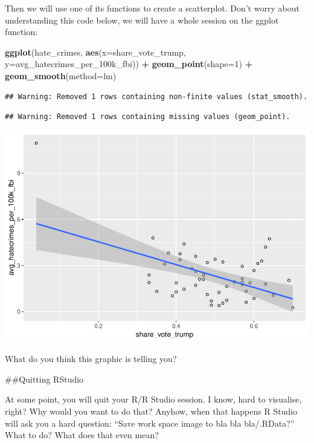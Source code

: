 \documentclass[]{book}
\newenvironment{Shaded}{\begin{snugshade}}{\end{snugshade}}
\newcommand{\DataTypeTok}[1]{\textcolor[rgb]{0.13,0.29,0.53}{#1}}
\newcommand{\DecValTok}[1]{\textcolor[rgb]{0.00,0.00,0.81}{#1}}
\newcommand{\KeywordTok}[1]{\textcolor[rgb]{0.13,0.29,0.53}{\textbf{#1}}}
\newcommand{\NormalTok}[1]{#1}
\newcommand{\OperatorTok}[1]{\textcolor[rgb]{0.81,0.36,0.00}{\textbf{#1}}}
\newcommand{\StringTok}[1]{\textcolor[rgb]{0.31,0.60,0.02}{#1}}
\theoremstyle{definition}
\theoremstyle{definition}
\theoremstyle{definition}
\theoremstyle{remark}
\begin{document}
Then we will use one of its functions to create a scatterplot. Don't
worry about understanding this code below, we will have a whole session
on the ggplot function:

\begin{Shaded}
\begin{Highlighting}[]
\KeywordTok{ggplot}\NormalTok{(hate_crimes, }\KeywordTok{aes}\NormalTok{(}\DataTypeTok{x=}\NormalTok{share_vote_trump, }\DataTypeTok{y=}\NormalTok{avg_hatecrimes_per_100k_fbi)) }\OperatorTok{+}
\StringTok{    }\KeywordTok{geom_point}\NormalTok{(}\DataTypeTok{shape=}\DecValTok{1}\NormalTok{) }\OperatorTok{+}
\StringTok{     }\KeywordTok{geom_smooth}\NormalTok{(}\DataTypeTok{method=}\NormalTok{lm)}
\end{Highlighting}
\end{Shaded}

\begin{verbatim}
## Warning: Removed 1 rows containing non-finite values (stat_smooth).
\end{verbatim}

\begin{verbatim}
## Warning: Removed 1 rows containing missing values (geom_point).
\end{verbatim}

\includegraphics{01-intro_files/figure-latex/unnamed-chunk-34-1.pdf}

What do you think this graphic is telling you?

\#\#Quitting RStudio

At some point, you will quit your R/R Studio session. I know, hard to
visualise, right? Why would you want to do that? Anyhow, when that
happens R Studio will ask you a hard question: ``Save work space image
to bla bla bla/.RData?'' What to do? What does that even mean?
\end{document}
